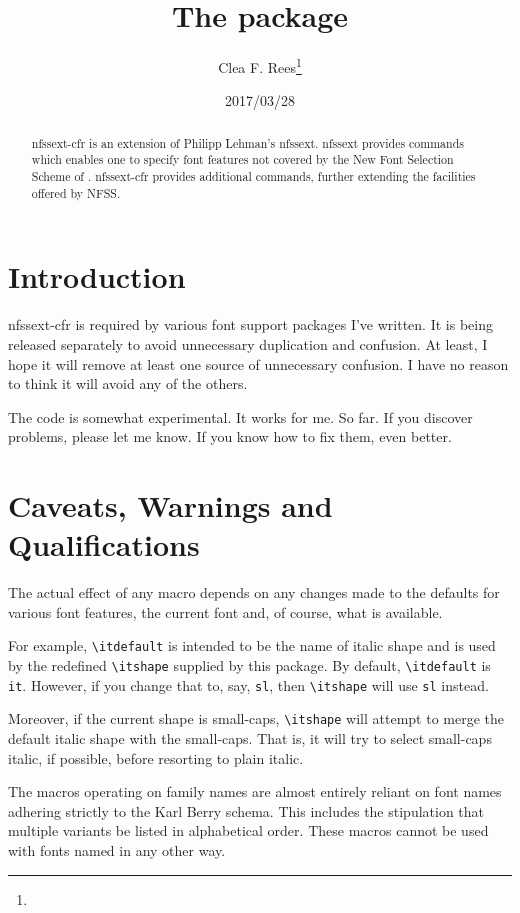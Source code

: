 \documentclass[pagesize=auto, fontsize=10pt, DIV=11]{scrartcl}
\title{The \pkg{nfssext-cfr} package}
\author{Clea F. Rees\thanks{\mail{ReesC21 <at> cardiff <dot> ac <dot> uk}}}
\date{2017/03/28}
\newcommand*{\pkg}[1]{\mbox{\textsf{#1}}}
\newcommand*{\cs}[1]{\texttt{\textbackslash #1}}
\begin{document}
\maketitle

\begin{abstract}
  \noindent \pkg{nfssext-cfr} is an extension of Philipp Lehman's \pkg{nfssext}\@.
  \pkg{nfssext} provides commands which enables one to specify font features not covered by the New Font Selection Scheme of \LaTeXe\@.
  \pkg{nfssext-cfr} provides additional commands, further extending the facilities offered by NFSS.
\end{abstract}

\section*{Introduction}

\pkg{nfssext-cfr} is required by various font support packages I've written.
It is being released separately to avoid unnecessary duplication and confusion.
At least, I hope it will remove at least one source of unnecessary confusion.
I have no reason to think it will avoid any of the others.

The code is somewhat experimental.
It works for me.
So far.
If you discover problems, please let me know.
If you know how to fix them, even better.

\section*{Caveats, Warnings and Qualifications}

The actual effect of any macro depends on any changes made to the defaults for various font features, the current font and, of course, what is available.

For example, \cs{itdefault} is intended to be the name of italic shape and is used by the redefined \cs{itshape} supplied by this package.
By default, \cs{itdefault} is \texttt{it}.
However, if you change that to, say, \texttt{sl}, then \cs{itshape} will use \texttt{sl} instead.

Moreover, if the current shape is small-caps, \cs{itshape} will attempt to merge the default italic shape with the small-caps.
That is, it will try to select small-caps italic, if possible, before resorting to plain italic.

The macros operating on family names are almost entirely reliant on font names adhering strictly to the Karl Berry schema.
This includes the stipulation that multiple variants be listed in alphabetical order.
These macros cannot be used with fonts named in any other way.
\end{document}
